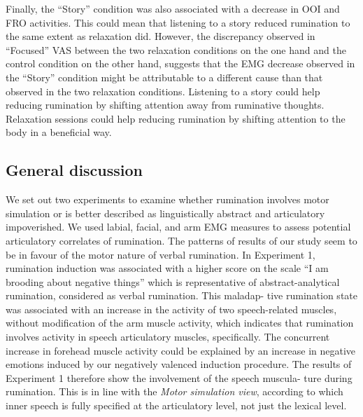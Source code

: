 \documentclass[a4paper,12pt,twoside,openright,oldfontcommands]{memoir}
\begin{document}
Finally, the \enquote{Story} condition was also associated with a decrease in OOI and FRO activities. This could mean that listening to a story reduced rumination to the same extent as relaxation did. However, the discrepancy observed in \enquote{Focused} VAS between the two relaxation conditions on the one hand and the control condition on the other hand, suggests that the EMG decrease observed in the \enquote{Story} condition might be attributable to a different cause than that observed in the two relaxation conditions. Listening to a story could help reducing rumination by shifting attention away from ruminative thoughts. Relaxation sessions could help reducing rumination by shifting attention to the body in a beneficial way.

\hypertarget{general-discussion}{%
\subsection{General discussion}\label{general-discussion}}

We set out two experiments to examine whether rumination involves motor simulation or is better described as linguistically abstract and articulatory impoverished. We used labial, facial, and arm EMG measures to assess potential articulatory correlates of rumination. The patterns of results of our study seem to be in favour of the motor nature of verbal rumination. In Experiment 1, rumination induction was associated with a higher score on the scale \enquote{I am brooding about negative things} which is representative of abstract-analytical rumination, considered as verbal rumination. This maladap- tive rumination state was associated with an increase in the activity of two speech-related muscles, without modification of the arm muscle activity, which indicates that rumination involves activity in speech articulatory muscles, specifically. The concurrent increase in forehead muscle activity could be explained by an increase in negative emotions induced by our negatively valenced induction procedure. The results of Experiment 1 therefore show the involvement of the speech muscula- ture during rumination. This is in line with the \emph{Motor simulation view}, according to which inner speech is fully specified at the articulatory level, not just the lexical level.
\end{document}
